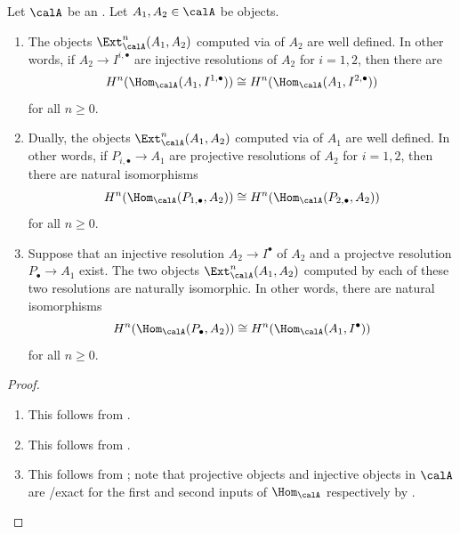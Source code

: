 \begin{theorem} \label{theorem:ext_objects_for_general_abelian_categories_are_well_defined_even_if_some_combination_of_projectives_or_injectives_exist}
    Let $\calA$ be an . Let $A_1,A_2 \in \calA$ be objects.
    \begin{enumerate}
        \item The objects $\Ext^n_\calA(A_1,A_2)$ computed via  of $A_2$ are well defined. In other words, if $A_2 \to I^{i,\bullet}$ are injective resolutions of $A_2$ for $i = 1,2$, then there are 
        $$H^n(\Hom_\calA(A_1, I^{1, \bullet})) \cong H^n(\Hom_\calA(A_1, I^{2, \bullet}))$$
        for all $n \geq 0$.

        \item Dually, the objects $\Ext^n_\calA(A_1,A_2)$ computed via  of $A_1$ are well defined. In other words, if $P_{i,\bullet} \to A_1$ are projective resolutions of $A_2$ for $i = 1,2$, then there are natural isomorphisms
        $$H^n(\Hom_\calA(P_{1,\bullet}, A_2)) \cong H^n(\Hom_\calA(P_{2,\bullet}, A_2))$$
        for all $n \geq 0$.

        \item Suppose that an injective resolution $A_2 \to I^\bullet$ of $A_2$ and a projectve resolution $P_\bullet \to A_1$ exist. The two objects $\Ext^n_\calA(A_1,A_2)$ computed by each of these two resolutions are naturally isomorphic. In other words, there are natural isomorphisms
        $$H^n(\Hom_\calA(P_\bullet, A_2)) \cong H^n(\Hom_\calA(A_1, I^\bullet))$$
        for all $n \geq 0$.
    \end{enumerate}
\end{theorem}
\begin{proof}
    \begin{enumerate}
        \item This follows from .
        \item This follows from .
        \item This follows from ; note that projective objects and injective objects in $\calA$ are /exact for the first and second inputs of $\Hom_\calA$ respectively by .
    \end{enumerate}
\end{proof}